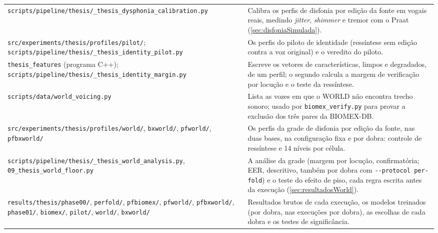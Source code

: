 \begin{apendicesenv}
{\begin{longtable}{@{}Y{0.30\textwidth}Y{0.64\textwidth}@{}}
			\raggedright\texttt{scripts/\allowbreak pipeline/\allowbreak thesis/\_thesis\_\allowbreak dysphonia\_\allowbreak calibration.py} & Calibra os perfis de disfonia por edição da fonte em vogais reais, medindo \textit{jitter}, \textit{shimmer} e tremor com o Praat (\autoref{sec:disfoniaSimulada}). \\
			\raggedright\texttt{src/\allowbreak experiments/\allowbreak thesis/\allowbreak profiles/\allowbreak pilot/}; \texttt{scripts/\allowbreak pipeline/\allowbreak thesis/\_thesis\_\allowbreak identity\_\allowbreak pilot.py} & Os perfis do piloto de identidade (ressíntese sem edição contra a voz original) e o veredito do piloto. \\
			\raggedright\texttt{thesis\_features} (programa C++); \texttt{scripts/\allowbreak pipeline/\allowbreak thesis/\_thesis\_\allowbreak identity\_\allowbreak margin.py} & Escreve os vetores de características, limpos e degradados, de um perfil; o segundo calcula a margem de verificação por locução e o teste da ressíntese. \\
			\raggedright\texttt{scripts/\allowbreak data/\allowbreak world\_\allowbreak voicing.py} & Lista as vozes em que o WORLD não encontra trecho sonoro; usado por \texttt{biomex\_verify.py} para provar a exclusão dos três pares da BIOMEX-DB. \\
			\raggedright\texttt{src/\allowbreak experiments/\allowbreak thesis/\allowbreak profiles/\allowbreak world/}, \texttt{bxworld/}, \texttt{pfworld/}, \texttt{pfbxworld/} & Os perfis da grade de disfonia por edição da fonte, nas duas bases, na configuração fixa e por dobra: controle de ressíntese e 14 níveis por célula. \\
			\raggedright\texttt{scripts/\allowbreak pipeline/\allowbreak thesis/\_thesis\_\allowbreak world\_\allowbreak analysis.py}, \texttt{09\_thesis\_\allowbreak world\_\allowbreak floor.py} & A análise da grade (margem por locução, confirmatória; \ac{EER}, descritivo, também por dobra com \texttt{-{}-protocol per-fold}) e o teste do efeito de piso, cada regra escrita antes da execução (\autoref{sec:resultadosWorld}). \\
			\raggedright\texttt{results/\allowbreak thesis/\allowbreak phase00/}, \texttt{perfold/}, \texttt{pfbiomex/}, \texttt{pfworld/}, \texttt{pfbxworld/}, \texttt{phase01/}, \texttt{biomex/}, \texttt{pilot/}, \texttt{world/}, \texttt{bxworld/} & Resultados brutos de cada execução, os modelos treinados (por dobra, nas execuções por dobra), as escolhas de cada dobra e os testes de significância. \\

\end{longtable}}
\end{apendicesenv}
